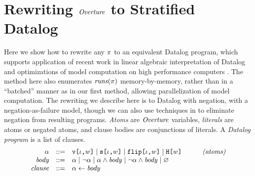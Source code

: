 \section{Rewriting $\mathit{Overture}$ to Stratified Datalog}
\label{section-bruteforce}

Here we show how to rewrite any $\pi$ to an equivalent Datalog
program, which supports application of recent work in linear algebraic
interpretation of Datalog and optimizations of model computation on
high performance computers \cite{sakama2017linear}. The method here also enumerates
$\mathit{runs}(\pi)$ memory-by-memory, rather than in a ``batched'' manner
as in our first method, allowing parallelization of model
computation. The rewriting we describe here is to Datalog with
negation, with a negation-as-failure model, though we can also
use techniques in \cite{sakama2017linear} to eliminate negation from
resulting programs. \emph{Atoms} are $\mathit{Overture}$ variables, \emph{literals}
are atoms or negated atoms, and clause bodies are conjunctions of literals.
A \emph{Datalog program} is a list of clauses.
$$
\begin{array}{rclr}
  \alpha &::=& \texttt{v[}\iota\texttt{,}w\texttt{]} \mid  \texttt{s[}\iota\texttt{,}w\texttt{]} \mid \texttt{flip[}\iota\texttt{,}w\texttt{]} \mid \texttt{H[}w\texttt{]} & \qquad \textit{(atoms)}\\
  \mathit{body} &::=&  \alpha \mid \neg \alpha \mid \alpha \wedge \mathit{body} \mid \neg\alpha \wedge \mathit{body} \mid \varnothing \\
  \mathit{clause} &::=& \alpha \gets \mathit{body}
\end{array}
$$

